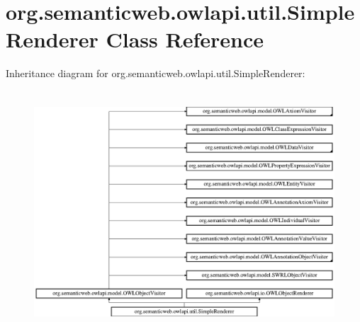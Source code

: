 \hypertarget{classorg_1_1semanticweb_1_1owlapi_1_1util_1_1_simple_renderer}{\section{org.\-semanticweb.\-owlapi.\-util.\-Simple\-Renderer Class Reference}
\label{classorg_1_1semanticweb_1_1owlapi_1_1util_1_1_simple_renderer}
}
Inheritance diagram for org.\-semanticweb.\-owlapi.\-util.\-Simple\-Renderer\-:\begin{figure}[H]
\begin{center}
\leavevmode
\includegraphics[height=9.056604cm]{classorg_1_1semanticweb_1_1owlapi_1_1util_1_1_simple_renderer}
\end{center}
\end{figure}
